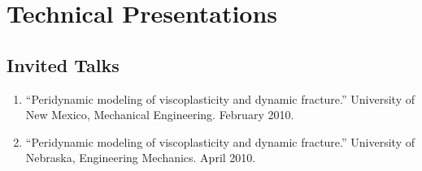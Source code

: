 \section*{Technical Presentations}

\subsection*{Invited Talks}

\ifdefined\iscockrell
\begin{enumerate}
    \item ``Peridynamic modeling of viscoplasticity and dynamic fracture.''  University of New Mexico, Mechanical Engineering. February 2010.

    \item ``Peridynamic modeling of viscoplasticity and dynamic fracture.''  University of Nebraska, Engineering Mechanics. April 2010.
\end{enumerate}
